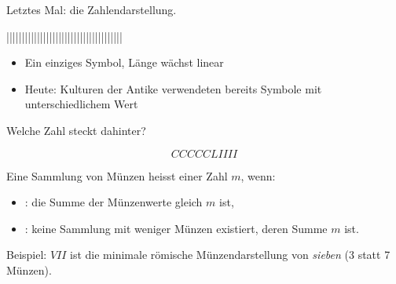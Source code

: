 \renewcommand{\thelektion}{L02 \textperiodcentered{} Basisgrössen \& Stellenwertdarstellung}

\begin{frame}\end{frame}

\begin{frame}
Letztes Mal: die  Zahlendarstellung.
\vspace{3mm}
\begin{center}
||||||||||||||||||||||||||||||||||||||
\end{center}
\begin{itemize}[<+->]\setlength\itemsep{5pt}
  \item Ein einziges Symbol, Länge wächst linear
  \item Heute: Kulturen der Antike verwendeten bereits  Symbole mit unterschiedlichem Wert
\end{itemize}
\end{frame}

{
\begin{frame}
\end{frame}}

\begin{frame}
\begin{center}
Welche Zahl steckt dahinter?
\end{center}
\begin{equation*}
	CCCCCLIIII
\end{equation*}
\end{frame}

\begin{frame}
Eine Sammlung von Münzen heisst  einer Zahl $m$, wenn:
\begin{itemize}[<+->]\setlength\itemsep{6pt}
  \item {}: die Summe der Münzenwerte gleich $m$ ist,
  \item {}: keine Sammlung mit weniger Münzen existiert, deren Summe $m$ ist.
\end{itemize}
\vspace{3mm}
\begin{center}
Beispiel: $VII$ ist die minimale römische Münzendarstellung von \textit{sieben} (3 statt 7 Münzen).
\end{center}
\end{frame}

